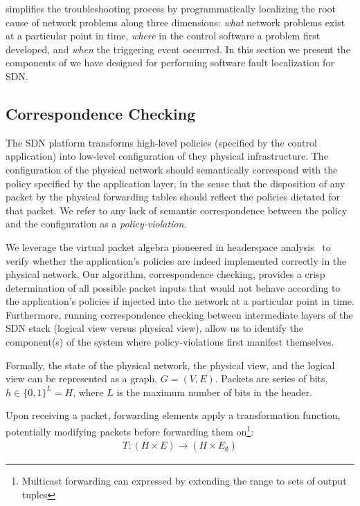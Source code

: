 \projectname{} simplifies the troubleshooting process by programmatically localizing the root cause
of network problems along three dimensions: {\it what} network problems exist at a
particular point in time, {\it where} in the control software a problem first developed, and
{\it when} the triggering event occurred. In this section we present 
the components of \projectname{} we have designed for performing software fault localization for SDN.

\subsection{Correspondence Checking}

The SDN platform transforms high-level policies (specified by the control application) into low-level configuration of they physical infrastructure.
The configuration of the physical network should semantically correspond with the policy specified by the application layer, in the sense that the disposition of any packet by the physical forwarding tables should reflect  the policies dictated for that packet. We refer to any lack of semantic correspondence
between the policy and the configuration as a {\it policy-violation}.

We leverage the virtual packet algebra pioneered in headerspace
analysis~\cite{hsa} to verify whether the application's policies are indeed
implemented correctly in the physical network. Our algorithm, correspondence
checking, provides a crisp determination of all possible packet inputs that
would not behave according to the application's policies if injected into the
network at a particular point in time. Furthermore, running correspondence
checking between intermediate layers of the SDN stack (logical view versus
physical view), allow us to identify the component(s) of
the system where policy-violations first manifest themselves.

Formally, the state of the physical network, the physical view, and the
logical view can be represented as a graph,
$G = (V, E)$. Packets are series of bits, $h \in \{0,1\}^L = H$,
where $L$ is the maximum number of bits in the header.

Upon receiving a packet,
forwarding elements apply a transformation function, potentially modifying
packets before forwarding them on\footnote{Multicast forwarding can expressed
by extending the range to sets of output tuples}:
\begin{align*}
T: (H \times E) \rightarrow (H \times E_{\emptyset})
\end{align*}

